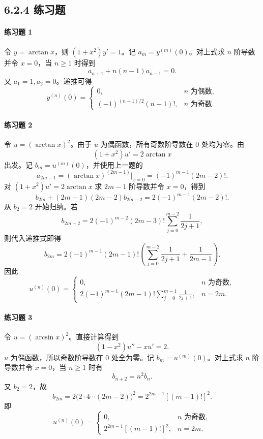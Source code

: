 \subsection*{6.2.4 练习题}

\paragraph{练习题 1}
\begin{xsolution}
令 $y=\arctan x$，则 $(1+x^2)y'=1$。记 $a_m=y^{(m)}(0)$。对上式求 $n$ 阶导数并令 $x=0$，当 $n\ge1$ 时得到
\[
  a_{n+1}+n(n-1)a_{n-1}=0.
\]
又 $a_1=1,a_2=0$。递推可得
\[
  \boxed{
  y^{(n)}(0)=
  \begin{cases}
    0,&n\text{ 为偶数},\\
    (-1)^{(n-1)/2}(n-1)!,&n\text{ 为奇数}.
  \end{cases}}
\]
\end{xsolution}

\paragraph{练习题 2}
\begin{xsolution}
令 $u=(\arctan x)^2$。由于 $u$ 为偶函数，所有奇数阶导数在 $0$ 处均为零。由
\[
  (1+x^2)u'=2\arctan x
\]
出发。记 $b_m=u^{(m)}(0)$，并使用上一题的
\[
  a_{2m-1}=(\arctan x)^{(2m-1)}\big|_{x=0}
  =(-1)^{m-1}(2m-2)!.
\]
对 $(1+x^2)u'=2\arctan x$ 求 $2m-1$ 阶导数并令 $x=0$，得到
\[
  b_{2m}+(2m-1)(2m-2)b_{2m-2}
  =2(-1)^{m-1}(2m-2)!.
\]
从 $b_2=2$ 开始归纳。若
\[
  b_{2m-2}=2(-1)^{m-2}(2m-3)!
  \sum_{j=0}^{m-2}\frac1{2j+1},
\]
则代入递推式即得
\[
  b_{2m}=2(-1)^{m-1}(2m-1)!
  \left(\sum_{j=0}^{m-2}\frac1{2j+1}+\frac1{2m-1}\right).
\]
因此
\[
  \boxed{
  u^{(n)}(0)=
  \begin{cases}
    0,&n\text{ 为奇数},\\[3pt]
    \displaystyle 2(-1)^{m-1}(2m-1)!\sum_{j=0}^{m-1}\frac1{2j+1},&n=2m.
  \end{cases}}
\]
\end{xsolution}

\paragraph{练习题 3}
\begin{xsolution}
令 $u=(\arcsin x)^2$。直接计算得到
\[
  (1-x^2)u''-xu'=2.
\]
$u$ 为偶函数，所以奇数阶导数在 $0$ 处全为零。记 $b_m=u^{(m)}(0)$。对上式求 $n$ 阶导数并令 $x=0$，当 $n\ge1$ 时有
\[
  b_{n+2}=n^2b_n.
\]
又 $b_2=2$，故
\[
  b_{2m}=2\bigl(2\cdot4\cdots(2m-2)\bigr)^2
  =2^{2m-1}[(m-1)!]^2.
\]
即
\[
  \boxed{
  u^{(n)}(0)=
  \begin{cases}
    0,&n\text{ 为奇数},\\
    2^{2m-1}[(m-1)!]^2,&n=2m.
  \end{cases}}
\]
\end{xsolution}

